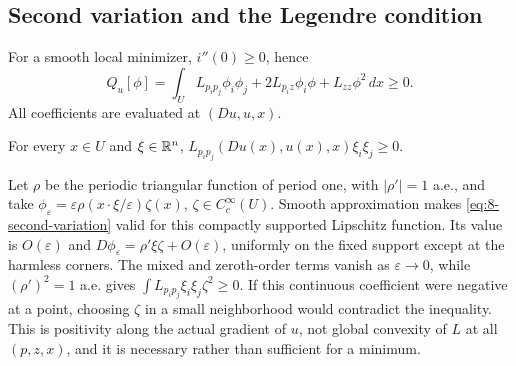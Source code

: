 \Needspace{45mm}
\subsection{Second variation and the Legendre condition}
For a smooth local minimizer, $i''(0)\geq0$, hence
\begin{equation}\label{eq:8-second-variation}
 Q_u[\phi]=\int_U L_{p_ip_j}\phi_i\phi_j
       +2L_{p_i z}\phi_i\phi+L_{zz}\phi^2\,dx\geq0.
\end{equation}
All coefficients are evaluated at $(Du,u,x)$.
\Needspace{55mm}
\begin{theorem}
For every $x\in U$ and $\xi\in\mathbb{R}^n$,
$L_{p_ip_j}(Du(x),u(x),x)\xi_i\xi_j\geq0$.
\end{theorem}
\begin{expandedproof}
Let $\rho$ be the periodic triangular function of period one, with
$|\rho'|=1$ a.e., and take
$\phi_\varepsilon=\varepsilon\rho(x\cdot\xi/\varepsilon)\zeta(x)$,
$\zeta\in C_c^\infty(U)$. Smooth approximation makes
\eqref{eq:8-second-variation} valid for this compactly supported Lipschitz
function. Its value is $O(\varepsilon)$ and
$D\phi_\varepsilon=\rho'\xi\zeta+O(\varepsilon)$, uniformly on the fixed
support except at the harmless corners. The mixed and zeroth-order terms
vanish as $\varepsilon\to0$, while $(\rho')^2=1$ a.e. gives
$\int L_{p_ip_j}\xi_i\xi_j\zeta^2\geq0$.
If this continuous coefficient were negative at a point, choosing $\zeta$
in a small neighborhood would contradict the inequality.
This is positivity along the actual gradient of $u$, not global convexity
of $L$ at all $(p,z,x)$, and it is necessary rather than sufficient for a minimum.
\end{expandedproof}
\Needspace{55mm}

\Needspace{45mm}
